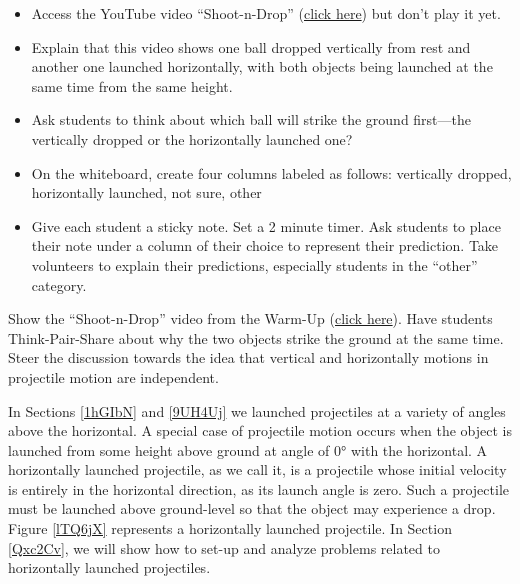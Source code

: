 \documentclass[main-physics.tex]{subfiles}
\begin{document}
\begin{warmup}
    \begin{itemize}
        \item Access the YouTube video ``Shoot-n-Drop'' (\href{https://youtu.be/zMF4CD7i3hg}{click here}) but don't play it yet. 
        \item Explain that this video shows one ball dropped vertically from rest and another one launched horizontally, with both objects being launched at the same time from the same height.
        \item Ask students to think about which ball will strike the ground first---the vertically dropped or the horizontally launched one?
        \item On the whiteboard, create four columns labeled as follows: vertically dropped, horizontally launched, not sure, other
        \item Give each student a sticky note. Set a 2 minute timer. Ask students to place their note under a column of their choice to represent their prediction. Take volunteers to explain their predictions, especially students in the ``other'' category.
    \end{itemize}
\end{warmup}

\begin{hook}
    Show the ``Shoot-n-Drop'' video from the Warm-Up (\href{https://youtu.be/zMF4CD7i3hg}{click here}). Have students Think-Pair-Share about why the two objects strike the ground at the same time. Steer the discussion towards the idea that vertical and horizontally motions in projectile motion are independent.
\end{hook}

\vspace{1em}

In Sections \ref{1hGIbN} and \ref{9UH4Uj} we launched projectiles at a variety of angles above the horizontal. A special case of projectile motion occurs when the object is launched from some height above ground at angle of \ang{0} with the horizontal. A \gls{horizontally launched projectile}, as we call it, is a projectile whose initial velocity is entirely in the horizontal direction, as its launch angle is zero. Such a projectile must be launched above ground-level so that the object may experience a drop. Figure \ref{lTQ6jX} represents a horizontally launched projectile. In Section \ref{Qxc2Cv}, we will show how to set-up and analyze problems related to horizontally launched projectiles.
\end{document}
